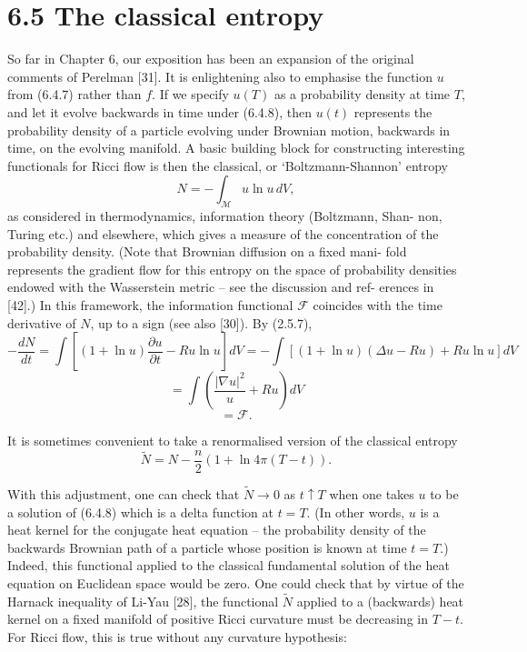 \section{6.5 \quad The classical entropy}

So far in Chapter 6, our exposition has been an expansion of the original
comments of Perelman [31]. It is enlightening also to emphasise the function
$u$ from (6.4.7) rather than $f$. If we specify $u(T)$ as a probability density
at time $T$, and let it evolve backwards in time under (6.4.8), then $u(t)$
represents the probability density of a particle evolving under Brownian
motion, backwards in time, on the evolving manifold. A basic building block
for constructing interesting functionals for Ricci flow is then the classical,
or `Boltzmann-Shannon' entropy
\[
  N = - \int_{\mathcal{M}} u \ln u\, dV,
\]
as considered in thermodynamics, information theory (Boltzmann, Shan-
non, Turing etc.) and elsewhere, which gives a measure of the concentration
of the probability density. (Note that Brownian diffusion on a fixed mani-
fold represents the gradient flow for this entropy on the space of probability
densities endowed with the Wasserstein metric -- see the discussion and ref-
erences in [42].) In this framework, the information functional $\mathcal{F}$
coincides with the time derivative of $N$, up to a sign (see also [30]). By (2.5.7),
\[
  -\frac{dN}{dt}
  = \int \left[ (1 + \ln u)\frac{\partial u}{\partial t} - Ru\ln u \right] dV
  = - \int \left[ (1 + \ln u)(\Delta u - Ru) + Ru\ln u \right] dV
  \tag{6.5.1}
\]
\[
  = \int \left( \frac{|\nabla u|^2}{u} + Ru \right) dV
\]
\[
  = \mathcal{F}.
\]

It is sometimes convenient to take a renormalised version of the classical
entropy
\[
  \widetilde{N} = N - \frac{n}{2}\left( 1 + \ln 4\pi (T - t) \right).
  \tag{6.5.2}
\]

With this adjustment, one can check that $\widetilde{N} \to 0$ as $t \uparrow T$
when one takes $u$ to be a solution of (6.4.8) which is a delta function at
$t = T$. (In other words, $u$ is a heat kernel for the conjugate heat equation --
the probability density of the backwards Brownian path of a particle whose
position is known at time $t = T$.) Indeed, this functional applied to the
classical fundamental solution of the heat equation on Euclidean space would
be zero. One could check that by virtue of the Harnack inequality of Li-Yau [28],
the functional $\widetilde{N}$ applied to a (backwards) heat kernel on a fixed
manifold of positive Ricci curvature must be decreasing in $T - t$. For Ricci flow,
this is true without any curvature hypothesis:

